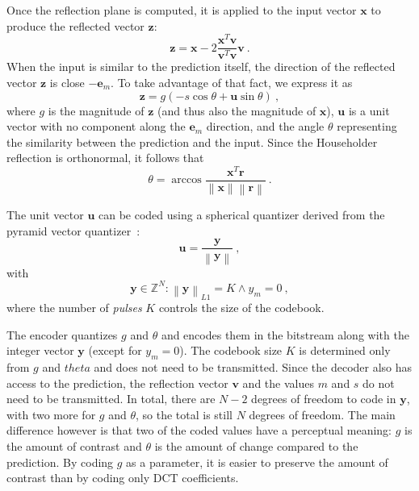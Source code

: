 \documentclass[english,conference,10pt]{IEEEtran}
\begin{document}
Once the reflection plane is computed, it is applied to the input vector
$\mathbf{x}$ to produce the reflected vector $\mathbf{z}$:
\begin{equation}
\mathbf{z} = \mathbf{x} - 2\frac{\mathbf{x}^T\mathbf{v}}
{\mathbf{v}^T\mathbf{v}}\mathbf{v}\ .
\end{equation}
When the input is similar to the prediction itself, the direction of the
reflected vector $\mathbf{z}$ is close $-\mathbf{e}_m$. To take advantage of
that fact, we express it as
\begin{equation}
\mathbf{z} = g\left(-s\cos\theta + \mathbf{u}\sin\theta\right)\ ,
\end{equation}
where $g$ is the magnitude of $\mathbf{z}$ (and thus also the magnitude of
$\mathbf{x}$), $\mathbf{u}$ is a unit vector with no component along the
$\mathbf{e}_m$ direction, and the angle $\theta$ representing the
similarity between the prediction and the input. Since the Householder
reflection is orthonormal, it follows that
\begin{equation}
\theta = \arccos\frac{\mathbf{x}^T\mathbf{r}}
                   {\left\|\mathbf{x}\right\|\left\|\mathbf{r}\right\|}\ .
\end{equation}

The unit vector $\mathbf{u}$ can be coded using a spherical quantizer derived
from the pyramid vector quantizer~\cite{Fischer1986}:
\begin{equation}
\mathbf{u}=\frac{\mathbf{y}}{\left\|\mathbf{y}\right\|}\ ,
\end{equation}
with
\begin{equation}
\mathbf{y} \in \mathbb{Z}^N : \left\|\mathbf{y}\right\|_{L1} = K \land y_m=0\ ,
\end{equation}
where the number of \textit{pulses} $K$ controls the size of the codebook.

The encoder quantizes $g$ and $\theta$ and encodes them in the bitstream along
with the integer vector $\mathbf{y}$ (except for $y_m=0$). The codebook
size $K$ is determined only from $g$ and $theta$ and does not need to be
transmitted. Since the decoder also has access to the prediction, the
reflection vector $\mathbf{v}$ and the values $m$ and $s$ do not need to
be transmitted. In total, there are $N-2$ degrees of freedom to code in
$\mathbf{y}$, with two more for $g$ and $\theta$, so the total is still
$N$ degrees of freedom. The main difference however is that two of the
coded values have a perceptual meaning: $g$ is the amount of contrast and
$\theta$ is the amount of change compared to the prediction. By coding $g$
as a parameter, it is easier to preserve the amount of contrast than by
coding only DCT coefficients.
\end{document}
